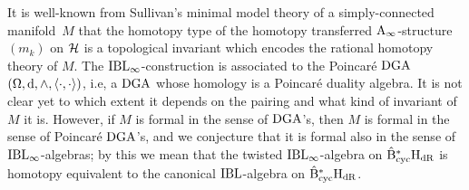 \documentclass[\MainFolder/Text.tex]{subfiles}
\begin{document}
It is well-known from Sullivan's minimal model theory of a simply-connected manifold~$M$ that the homotopy type of the homotopy transferred $\mathrm{A}_\infty$-structure $(m_k)$ on $\mathcal{H}$ is a topological invariant which encodes the rational homotopy theory of $M$.
The $\mathrm{IBL}_\infty$-construction is associated to the Poincar\'e $\mathrm{DGA}$ $(\Omega,\mathrm{d},\wedge, \langle\cdot,\cdot\rangle)$, i.e, a $\mathrm{DGA}$ whose homology is a Poincar\'e duality algebra.
It is not clear yet to which extent it depends on the pairing and what kind of invariant of $M$ it is. 
However, if $M$ is formal in the sense of $\mathrm{DGA}$'s, then $M$ is formal in the sense of Poincar\'e $\mathrm{DGA}$'s, and we conjecture that it is formal also in the sense of $\mathrm{IBL}_\infty$-algebras; by this we mean that the twisted $\mathrm{IBL}_\infty$-algebra on $\hat{\mathrm{B}}_{\mathrm{cyc}}^* \mathrm{H}_{\mathrm{dR}}$ is homotopy equivalent to the canonical $\mathrm{IBL}$-algebra on $\hat{\mathrm{B}}_{\mathrm{cyc}}^* \mathrm{H}_{\mathrm{dR}}$.
\end{document}
